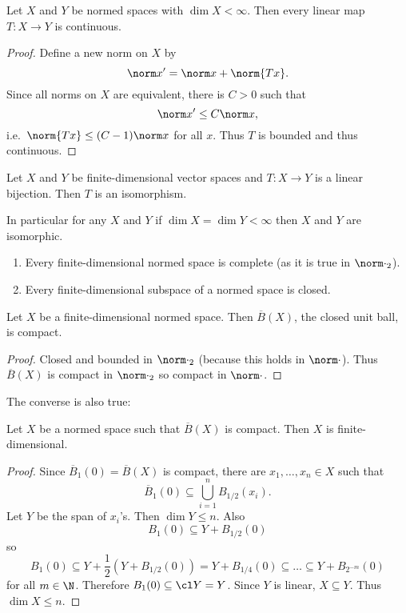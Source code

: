 \documentclass[a4paper]{article}
\begin{document}
\begin{corollary}
  Let \(X\) and \(Y\) be normed spaces with \(\dim X < \infty\). Then every linear map \(T: X \to Y\) is continuous.
\end{corollary}

\begin{proof}
  Define a new norm on \(X\) by
  \[
    \norm x' = \norm x + \norm{T x}.
  \]
  Since all norms on \(X\) are equivalent, there is \(C > 0\) such that
  \[
    \norm x' \leq C \norm x,
  \]
  i.e.\ \(\norm{T x} \leq (C - 1) \norm x\) for all \(x\). Thus \(T\) is bounded and thus continuous.
\end{proof}

\begin{corollary}
  Let \(X\) and \(Y\) be finite-dimensional vector spaces and \(T: X \to Y\) is a linear bijection. Then \(T\) is an isomorphism.

  In particular for any \(X\) and \(Y\) if \(\dim X = \dim Y < \infty\) then \(X\) and \(Y\) are isomorphic.
\end{corollary}

\begin{corollary}\leavevmode
  \begin{enumerate}
  \item Every finite-dimensional normed space is complete (as it is true in \(\norm \cdot_2\)).
  \item Every finite-dimensional subspace of a normed space is closed.
  \end{enumerate}
\end{corollary}

\begin{corollary}
  Let \(X\) be a finite-dimensional normed space. Then \(\overline B(X)\), the closed unit ball, is compact.
\end{corollary}

\begin{proof}
  Closed and bounded in \(\norm \cdot_2\) (because this holds in \(\norm \cdot\)). Thus \(\overline B(X)\) is compact in \(\norm \cdot_2\) so compact in \(\norm \cdot\).
\end{proof}

The converse is also true:
\begin{theorem}
  Let \(X\) be a normed space such that \(\overline B(X)\) is compact. Then \(X\) is finite-dimensional.
\end{theorem}

\begin{proof}
  Since \(\overline B_1(0) = \overline B(X)\) is compact, there are \(x_1, \dots, x_n \in X\) such that
  \[
    \overline B_1(0) \subseteq \bigcup_{i = 1}^n B_{1/2}(x_i).
  \]
  Let \(Y\) be the span of \(x_i\)'s. Then \(\dim Y \leq n\). Also
  \[
    B_1(0) \subseteq Y + B_{1/2}(0)
  \]
  so
  \[
    B_1(0) \subseteq Y + \frac{1}{2} (Y + B_{1/2}(0))
    = Y + B_{1/4}(0)
    \subseteq \dots
    \subseteq Y + B_{2^{-m}}(0)
  \]
  for all \(m \in \N\). Therefore \(B_1(0) \subseteq \cl Y = Y\). Since \(Y\) is linear, \(X \subseteq Y\). Thus \(\dim X \leq n\).
\end{proof}
\end{document}
